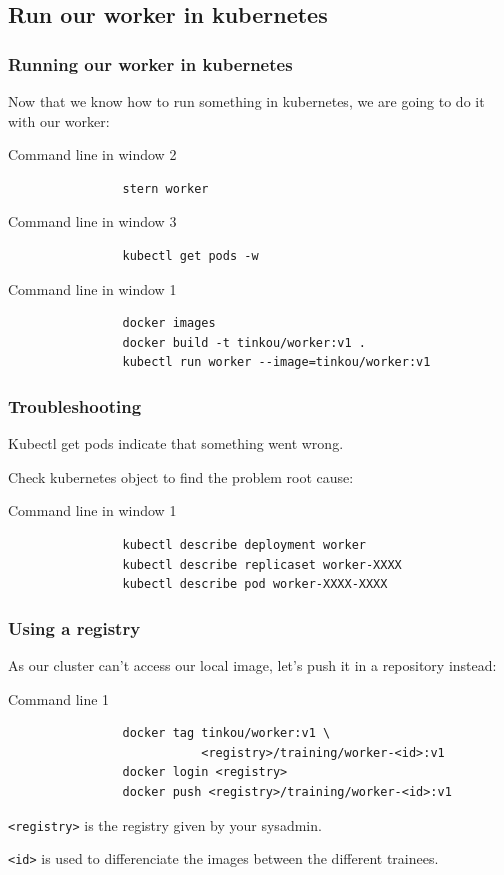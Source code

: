 \subsection{Run our worker in kubernetes}

	\begin{frame}[fragile]
		\frametitle{Running our worker in kubernetes}
		
		Now that we know how to run something in kubernetes, we are going to do it with our worker:
		\begin{block}{Command line in window 2}
			\begin{verbatim}
				stern worker
			\end{verbatim}
		\end{block}		
		\begin{block}{Command line in window 3}
			\begin{verbatim}
				kubectl get pods -w
			\end{verbatim}
		\end{block}
		\begin{block}{Command line in window 1}
			\begin{verbatim}
				docker images
				docker build -t tinkou/worker:v1 .
				kubectl run worker --image=tinkou/worker:v1
			\end{verbatim}
		\end{block}
	\end{frame}
	
	\begin{frame}[fragile]
		\frametitle{Troubleshooting}
		
		Kubectl get pods indicate that something went wrong.
		
		Check kubernetes object to find the problem root cause:
		\begin{block}{Command line in window 1}
			\begin{verbatim}
				kubectl	describe deployment worker
				kubectl describe replicaset worker-XXXX
				kubectl describe pod worker-XXXX-XXXX
			\end{verbatim}
		\end{block}
		
	\end{frame}
	
	\begin{frame}[fragile]
		\frametitle{Using a registry}
		
		As our cluster can't access our local image, let's push it in a repository instead:
		\begin{block}{Command line 1}
			\begin{verbatim}
				docker tag tinkou/worker:v1 \
				           <registry>/training/worker-<id>:v1
				docker login <registry>
				docker push <registry>/training/worker-<id>:v1
			\end{verbatim}
		\end{block}
		\verb|<registry>| is the registry given by your sysadmin.
		
		\verb|<id>| is used to differenciate the images between the different trainees.

	\end{frame}
	
